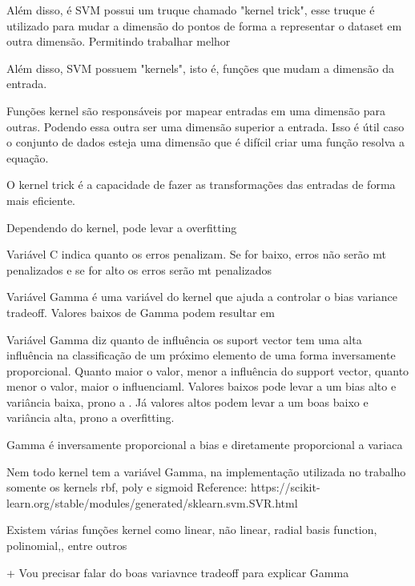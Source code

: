 Além disso, é SVM possui um truque chamado "kernel trick", esse truque é utilizado para mudar a dimensão do pontos de forma a representar o dataset em outra dimensão. Permitindo trabalhar melhor

Além disso, SVM possuem "kernels", isto é, funções que mudam a dimensão da entrada. 

Funções kernel são responsáveis por mapear entradas em uma dimensão para outras. Podendo essa outra ser uma dimensão superior a entrada. Isso é útil caso o conjunto de dados esteja uma dimensão que é difícil criar uma função resolva a equação.

O kernel trick é a capacidade de fazer as transformações das entradas de forma mais eficiente.

Dependendo do kernel, pode levar a overfitting

Variável C indica quanto os erros penalizam. Se for baixo, erros não serão mt penalizados e se for alto os erros serão mt penalizados

Variável Gamma é uma variável do kernel que ajuda a controlar o bias variance tradeoff. Valores baixos de Gamma podem resultar em

Variável Gamma diz quanto de influência os suport vector tem uma alta influência na classificação de um próximo elemento de uma forma inversamente proporcional. Quanto maior o valor, menor a influência do support vector, quanto menor o valor, maior o influenciaml. Valores baixos pode levar a um bias alto e variância baixa, prono a . Já valores altos podem levar a um boas baixo e variância alta, prono a overfitting.

Gamma é inversamente proporcional a bias e diretamente proporcional a variaca

Nem todo kernel tem a variável Gamma, na implementação utilizada no trabalho somente os kernels rbf, poly e sigmoid 
Reference: https://scikit-learn.org/stable/modules/generated/sklearn.svm.SVR.html




Existem várias funções kernel como linear, não linear, radial basis function, polinomial,, entre outros

+ Vou precisar falar do boas variavnce tradeoff para explicar Gamma


